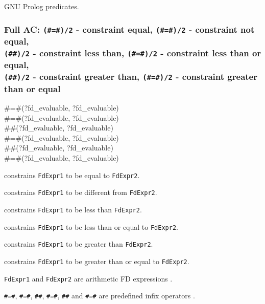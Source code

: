 \Portability

GNU Prolog predicates.

\subsubsection{Full AC: \texttt{(\#=\#)/2} - constraint equal,
\texttt{(\#{\bs}=\#)/2} - constraint not equal, \\
\texttt{(\#{\lt}\#)/2} - constraint less than,
\texttt{(\#={\lt}\#)/2} - constraint less than or equal, \\
\texttt{(\#{\gt}\#)/2} - constraint greater than,
\texttt{(\#{\gt}=\#)/2} - constraint greater than or equal}
\label{Full-AC:-(:=:)/2}

\begin{TemplatesOneCol}
\#=\#(?fd\_evaluable, ?fd\_evaluable)\\
\#{\bs}=\#(?fd\_evaluable, ?fd\_evaluable)\\
\#{\lt}\#(?fd\_evaluable, ?fd\_evaluable)\\
\#={\lt}\#(?fd\_evaluable, ?fd\_evaluable)\\
\#{\gt}\#(?fd\_evaluable, ?fd\_evaluable)\\
\#{\gt}=\#(?fd\_evaluable, ?fd\_evaluable)

\end{TemplatesOneCol}

\Description

 constrains \texttt{FdExpr1} to
be equal to \texttt{FdExpr2}.

 constrains \texttt{FdExpr1} to be
different from \texttt{FdExpr2}.

 constrains \texttt{FdExpr1}
to be less than \texttt{FdExpr2}.

 constrains \texttt{FdExpr1} to be
less than or equal to \texttt{FdExpr2}.

 constrains \texttt{FdExpr1}
to be greater than \texttt{FdExpr2}.

 constrains \texttt{FdExpr1} to be
greater than or equal to \texttt{FdExpr2}.

\texttt{FdExpr1} and \texttt{FdExpr2} are arithmetic FD expressions
.

\texttt{\#=\#}, \texttt{\#{\bs}=\#}, \texttt{\#{\lt}\#},
\texttt{\#={\lt}\#}, \texttt{\#{\gt}\#} and \texttt{\#{\gt}=\#} are
predefined infix operators .


